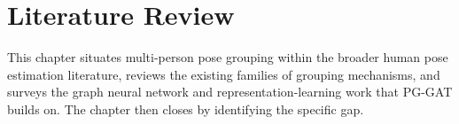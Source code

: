 
\chapter{Literature Review}
\label{chap_2}

This chapter situates multi-person pose grouping within the broader human pose estimation literature,
reviews the existing families of grouping mechanisms,
and surveys the graph neural network and representation-learning work that PG-GAT builds on.
The chapter then closes by identifying the specific gap.








